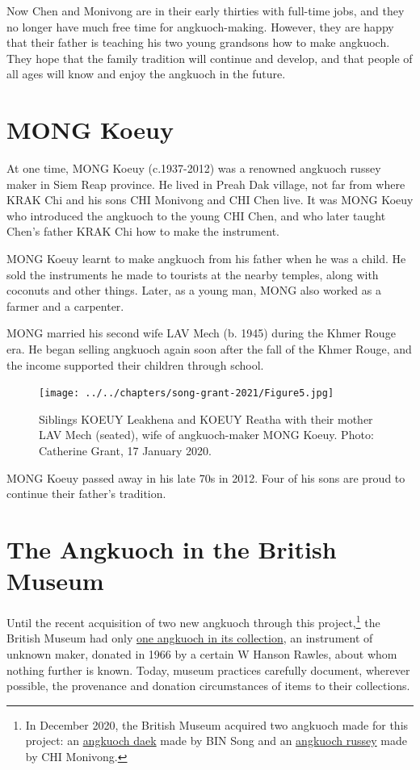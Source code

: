 \documentclass[twoside]{article}
\begin{document}
Now Chen and Monivong are in their early thirties with full-time jobs,
and they no longer have much free time for angkuoch-making. However,
they are happy that their father is teaching his two young grandsons how
to make angkuoch. They hope that the family tradition will continue and
develop, and that people of all ages will know and enjoy the angkuoch in
the future.

\hypertarget{mong-koeuy}{%
\section*{MONG Koeuy}\label{mong-koeuy}}

At one time, MONG Koeuy (c.1937-2012) was a renowned angkuoch russey
maker in Siem Reap province. He lived in Preah Dak village, not far from
where KRAK Chi and his sons CHI Monivong and CHI Chen live. It was MONG
Koeuy who introduced the angkuoch to the young CHI Chen, and who later
taught Chen's father KRAK Chi how to make the instrument.

MONG Koeuy learnt to make angkuoch from his father when he was a child.
He sold the instruments he made to tourists at the nearby temples, along
with coconuts and other things. Later, as a young man, MONG also worked
as a farmer and a carpenter.

MONG married his second wife LAV Mech (b. 1945) during the Khmer Rouge
era. He began selling angkuoch again soon after the fall of the Khmer
Rouge, and the income supported their children through school.

\begin{figure}
  \texttt{[image: ../../chapters/song-grant-2021/Figure5.jpg]}
  \caption{Siblings KOEUY Leakhena
  and KOEUY Reatha with their mother LAV Mech (seated), wife of
  angkuoch-maker MONG Koeuy. Photo: Catherine Grant, 17 January 2020.}
\end{figure}

MONG Koeuy passed away in his late 70s in 2012. Four of his sons are
proud to continue their father's tradition.

\hypertarget{the-angkuoch-in-the-british-museum}{%
\section*{The Angkuoch in the British
Museum}\label{the-angkuoch-in-the-british-museum}}

Until the recent acquisition of two new angkuoch through this
project,\footnote{In December 2020, the British Museum acquired two
  angkuoch made for this project: an
  \href{https://www.britishmuseum.org/collection/object/A_2020-3017-2}{angkuoch
  daek} made by BIN Song and an
  \href{https://www.britishmuseum.org/collection/object/A_2020-3017-1}{angkuoch
  russey} made by CHI Monivong.} the British Museum had only
\href{https://www.britishmuseum.org/collection/object/A_As1966-11-5}{one
angkuoch in its collection}, an instrument of unknown maker, donated in
1966 by a certain W Hanson Rawles, about whom nothing further is known.
Today, museum practices carefully document, wherever possible, the
provenance and donation circumstances of items to their collections.
\end{document}
